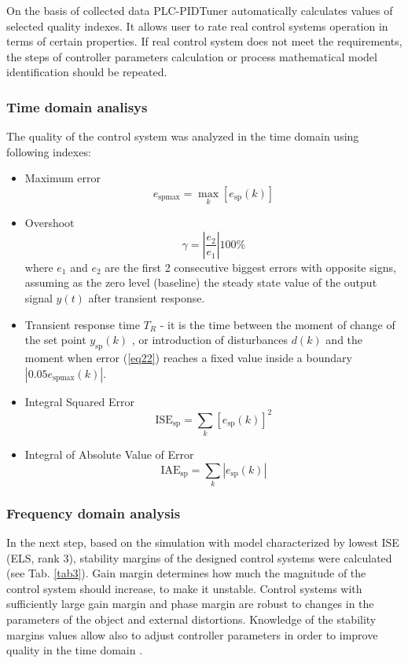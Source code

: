 \documentclass{amcs}
\begin{document}
On the basis of collected data PLC-PIDTuner automatically calculates values of selected quality indexes. It allows user to rate real control systems operation in terms of certain properties. If real control system does not meet the requirements, the steps of controller parameters  calculation or process mathematical model identification should be repeated.

\subsubsection{Time domain analisys}
%
The quality of the control system was analyzed in the time domain using following indexes: 
\begin{itemize}
	\item Maximum error 
	\begin{equation}
	e_{\text{sp}\max}=\max_{k}[e_{\text{sp}}(k)]
	\end{equation}\label{eq22}
	\item Overshoot 
	\begin{equation}
	\gamma=\left|\dfrac{e_2}{e_1}\right|100\%
	\end{equation}\label{eq24}
	where $e_1$ and $e_2$ are the first 2 consecutive biggest errors with opposite signs, assuming as the zero level (baseline) the steady state value of the output signal $y(t)$ after transient response.
	\item Transient response time $T_{R}$ - it is the time between the moment of change of the set point $y_{\text{sp}}(k)$ , or introduction of disturbances $d(k)$ and the moment when  error (\ref{eq22}) reaches a fixed value inside a boundary $|0.05 e_{\text{sp}\max}(k)|$. 
	\item Integral Squared Error 
	\begin{equation}
	\text{ISE}_{\text{sp}}=\sum_{k}[e_{\text{sp}}(k)]^{2} 
	\end{equation}\label{eq25}
	\item Integral of Absolute Value of Error 
	\begin{equation}
	\text{IAE}_{\text{sp}}=\sum_{k}|e_{\text{sp}}(k)| 
	\end{equation}\label{eq26}
\end{itemize}

\subsubsection{Frequency domain analysis}
%
In the next step, based on the simulation with model characterized by lowest ISE (ELS, rank 3), stability margins of the designed control systems were calculated (see Tab. \ref{tab3}). Gain margin determines how much the magnitude of the control system should increase, to make it unstable. Control systems with sufficiently large gain margin and phase margin are robust to changes in the parameters of the object and external distortions. Knowledge of the stability margins values allow also to adjust controller parameters in order to improve quality in the time domain \cite{Mozaryn:2013}.   
\end{document}

